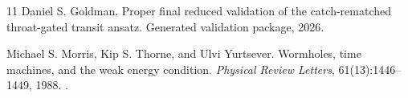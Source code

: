 \documentclass[11pt]{article}
\begin{document}
\begin{thebibliography}{11}
Daniel S. Goldman.
\newblock Proper final reduced validation of the catch-rematched throat-gated transit ansatz.
\newblock Generated validation package, 2026.

Michael S. Morris, Kip S. Thorne, and Ulvi Yurtsever.
\newblock Wormholes, time machines, and the weak energy condition.
\newblock \emph{Physical Review Letters}, 61(13):1446--1449, 1988.
\newblock {}.

\end{thebibliography}
\end{document}
